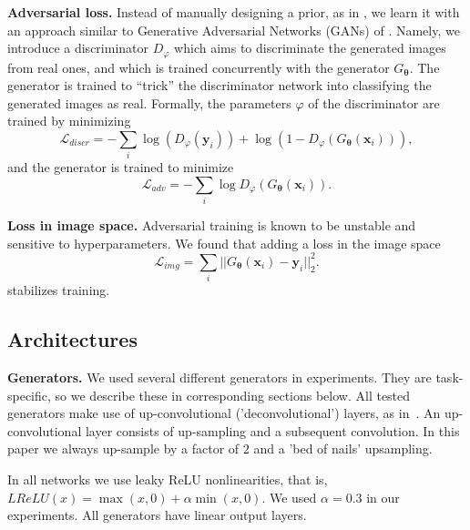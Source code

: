 \documentclass{article}
\newcommand{\inp}{\mathbf{x}}
\newcommand{\targ}{\mathbf{y}}
\newcommand{\weights}{\mathbf{\theta}}
\newcommand{\gen}{G_\weights}
\newcommand{\discr}{D_\varphi}
\newcommand{\loss}{\mathcal{L}}
\newcommand{\discrloss}{\loss_{adv}}
\newcommand{\pixloss}{\loss_{img}}
\begin{document}
\textbf{Adversarial loss.} Instead of manually designing a prior, as in \citet{Mahendran_CVPR2015}, we learn it with an approach similar to Generative Adversarial Networks (GANs) of \citet{Goodfellow_NIPS2014}.
Namely, we introduce a discriminator $\discr$ which aims to discriminate the generated images from real ones, and which is trained concurrently with the generator $\gen$.
The generator is trained to ``trick'' the discriminator network into classifying the generated images as real.
Formally, the parameters $\varphi$ of the discriminator are trained by minimizing
\begin{equation} \label{eq:discrloss_discr}
 \mathcal{L}_{discr} = - \sum\limits_{i} \log (\discr(\targ_i)) + \log (1 - \discr(\gen(\inp_i))), 
\end{equation}
and the generator is trained to minimize
\begin{equation} \label{eq:discrloss_gen}
 \discrloss = - \sum\limits_{i} \log \discr(\gen(\inp_i)).
\end{equation}

\textbf{Loss in image space.}
Adversarial training is known to be unstable and sensitive to hyperparameters.
We found that adding a loss in the image space
\begin{equation}
 \pixloss = \sum\limits_{i} || \gen(\inp_i) - \targ_i ||_2^2.
\end{equation}
stabilizes training.

\subsection{Architectures}

\textbf{Generators.} 
We used several different generators in experiments. 
They are task-specific, so we describe these in corresponding sections below.
All tested generators make use of up-convolutional ('deconvolutional') layers, as in~\citet{Dosovitskiy_CVPR2015}.
An up-convolutional layer consists of up-sampling and a subsequent convolution.
In this paper we always up-sample by a factor of $2$ and a 'bed of nails' upsampling.

In all networks we use leaky ReLU nonlinearities, that is, $LReLU(x) = \max(x,0) + \alpha \min(x,0)$.
We used $\alpha = 0.3$ in our experiments.
All generators have linear output layers.
\end{document}
